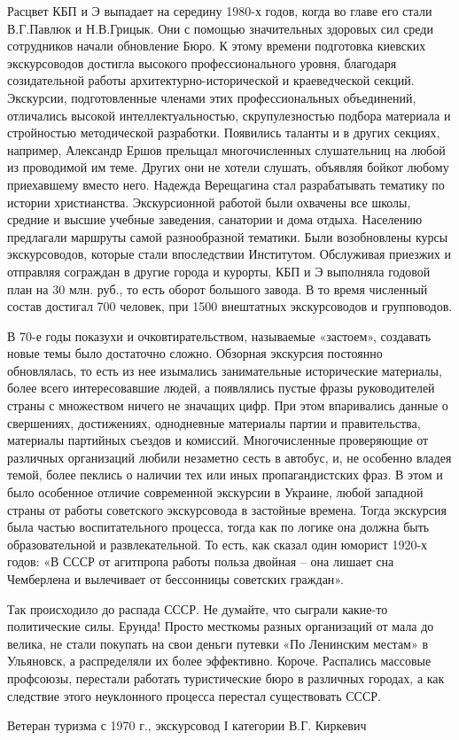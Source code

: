 Расцвет КБП и Э выпадает на середину 1980-х годов, когда во главе его стали
В.Г.Павлюк и Н.В.Грицык. Они с помощью значительных здоровых сил среди
сотрудников начали обновление Бюро. К этому времени подготовка киевских
экскурсоводов достигла высокого профессионального уровня, благодаря
созидательной работы архитектурно-исторической и краеведческой секций.
Экскурсии, подготовленные членами этих профессиональных объединений, отличались
высокой интеллектуальностью, скрупулезностью подбора материала и стройностью
методической разработки. Появились таланты и в других секциях, например,
Александр Ершов прельщал многочисленных слушательниц на любой из проводимой им
теме. Других они не хотели слушать, объявляя бойкот любому приехавшему вместо
него. Надежда Верещагина стал разрабатывать тематику по истории христианства.
Экскурсионной работой были охвачены все школы, средние и высшие учебные
заведения, санатории и дома отдыха. Населению предлагали маршруты самой
разнообразной тематики. Были возобновлены курсы экскурсоводов, которые стали
впоследствии Институтом. Обслуживая приезжих и отправляя сограждан в другие
города и курорты, КБП и Э выполняла годовой план на 30 млн. руб., то есть
оборот большого завода. В то время численный состав достигал 700 человек, при
1500 внештатных экскурсоводов и групповодов.

В 70-е годы показухи и очковтирательством, называемые «застоем», создавать
новые темы было достаточно сложно. Обзорная экскурсия постоянно обновлялась, то
есть из нее изымались занимательные исторические материалы, более всего
интересовавшие людей, а появлялись пустые фразы руководителей страны с
множеством ничего не значащих цифр. При этом впаривались данные о свершениях,
достижениях, однодневные материалы партии и правительства, материалы партийных
съездов и комиссий. Многочисленные проверяющие от различных организаций любили
незаметно сесть в автобус, и, не особенно владея темой, более пеклись о наличии
тех или иных пропагандистских фраз. В этом и было особенное отличие современной
экскурсии в Украине, любой западной страны от работы советского экскурсовода в
застойные времена. Тогда экскурсия была частью воспитательного процесса, тогда
как по логике она должна быть образовательной и развлекательной. То есть, как
сказал один юморист 1920-х годов: «В СССР от агитпропа работы польза двойная –
она лишает сна Чемберлена и вылечивает от бессонницы советских граждан».

Так происходило до распада СССР. Не думайте, что сыграли какие-то политические
силы. Ерунда! Просто месткомы разных организаций от мала до велика, не стали
покупать на свои деньги путевки «По Ленинским местам» в Ульяновск, а
распределяли их более эффективно. Короче. Распались массовые профсоюзы,
перестали работать туристические бюро в различных городах, а как следствие
этого неуклонного процесса перестал существовать СССР.

Ветеран туризма с 1970 г., экскурсовод І категории В.Г. Киркевич
